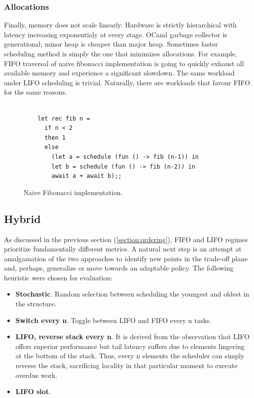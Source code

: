 \documentclass[12pt,a4paper,twoside]{report}
\begin{document}
\subsubsection{Allocations}

Finally, memory does not scale linearly. Hardware is strictly hierarchical with latency increasing exponentialy at every stage. OCaml garbage collector is generational; minor heap is cheaper than major heap. Sometimes faster scheduling method is simply the one that minimizes allocations. For example, FIFO traversal of naive fibonacci implementation is going to quickly exhaust all available memory and experience a significant slowdown. The same workload under LIFO scheduling is trivial. Naturally, there are workloads that favour FIFO for the same reasons.


\begin{figure}
    \centering
    \begin{verbatim}

    let rec fib n = 
      if n < 2 
      then 1 
      else
        (let a = schedule (fun () -> fib (n-1)) in
        let b = schedule (fun () -> fib (n-2)) in 
        await a + await b);;

    \end{verbatim}
    \caption{Naive Fibonacci implementation.}
    \label{fig:fib-pure}
\end{figure}


\subsection{Hybrid}
As discussed in the previous section (\ref{section:ordering}), FIFO and LIFO regimes prioritize fundamentally different metrics. A natural next step is an attempt at amalgamation of the two approaches to identify new points in the trade-off plane and, perhaps, generalize or move towards an adaptable policy. The following heuristic were chosen for evaluation: 


\begin{itemize}
    \item \textbf{Stochastic}. Random selection between scheduling the youngest and oldest in the structure. 
    \item \textbf{Switch every n}. Toggle between LIFO and FIFO every n tasks.
    \item \textbf{LIFO, reverse stack every n}. It is derived from the observation that LIFO offers superior performance but tail latency suffers due to elements lingering at the bottom of the stack. Thus, every n elements the scheduler can simply reverse the stack, sacrificing locality in that particular moment to execute overdue work.    
    \item \textbf{LIFO slot}. 
\end{itemize}
\end{document}
